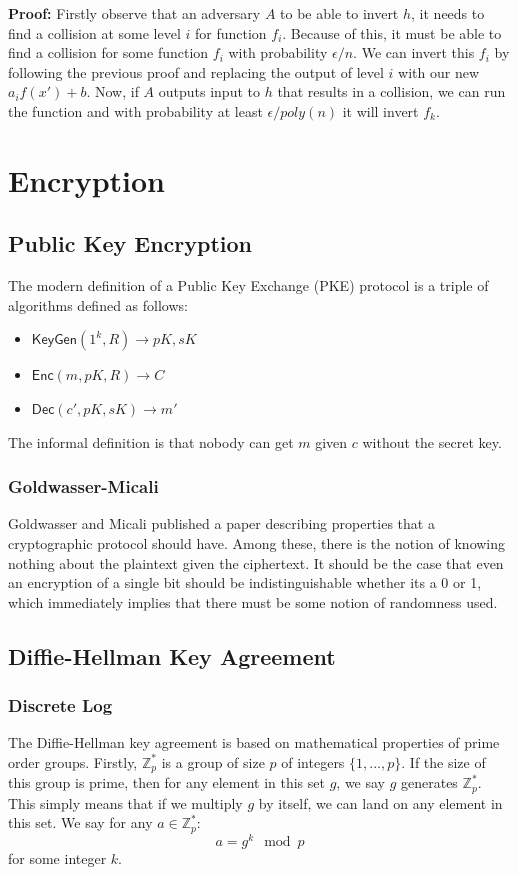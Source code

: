 \documentclass[11pt]{article}
\begin{document}
\textbf{Proof:} Firstly observe that an adversary $A$ to be able to invert $h$, it needs to find a collision at some level $i$ for function $f_i$. Because of this, it must be able to find a collision for some function $f_i$ with probability $\epsilon/n$. We can invert this $f_i$ by following the previous proof and replacing the output of level $i$ with our new $a_if(x')+b$. Now, if $A$ outputs input to $h$ that results in a collision, we can run the function and with probability at least $\epsilon/poly(n)$ it will invert $f_k$.

\section{Encryption}
\subsection{Public Key Encryption}
The modern definition of a Public Key Exchange (PKE) protocol is a triple of algorithms defined as follows:
\begin{itemize}
    \item $\mathsf{KeyGen}(1^k,R) \rightarrow pK, sK$
    \item $\mathsf{Enc}(m,pK,R) \rightarrow C$
    \item $\mathsf{Dec}(c',pK,sK) \rightarrow m'$
\end{itemize}
The informal definition is that nobody can get $m$ given $c$ without the secret key.

\subsubsection{Goldwasser-Micali}
Goldwasser and Micali published a paper describing properties that a cryptographic protocol should have. Among these, there is the notion of knowing nothing about the plaintext given the ciphertext. It should be the case that even an encryption of a single bit should be indistinguishable whether its a 0 or 1, which immediately implies that there must be some notion of randomness used.

\subsection{Diffie-Hellman Key Agreement}
\subsubsection{Discrete Log}
The Diffie-Hellman key agreement is based on mathematical properties of prime order groups. Firstly, $\mathbb{Z}_p^*$ is a group of size $p$ of integers $\{1,...,p\}$. If the size of this group is prime, then for any element in this set $g$, we say $g$ generates $\mathbb{Z}_p^*$. This simply means that if we multiply $g$ by itself, we can land on any element in this set. We say for any $a \in \mathbb{Z}_p^*$:
$$a = g^k \mod p$$
for some integer $k$.
\vspace{1em}
\end{document}
